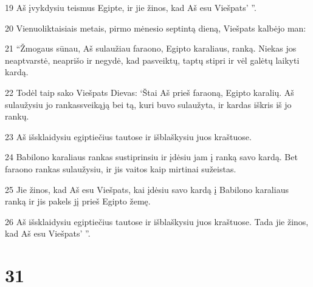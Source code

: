 \par 19 Aš įvykdysiu teismus Egipte, ir jie žinos, kad Aš esu Viešpats’ ”. 
\par 20 Vienuoliktaisiais metais, pirmo mėnesio septintą dieną, Viešpats kalbėjo man: 
\par 21 “Žmogaus sūnau, Aš sulaužiau faraono, Egipto karaliaus, ranką. Niekas jos neaptvarstė, neaprišo ir negydė, kad pasveiktų, taptų stipri ir vėl galėtų laikyti kardą. 
\par 22 Todėl taip sako Viešpats Dievas: ‘Štai Aš prieš faraoną, Egipto karalių. Aš sulaužysiu jo rankas­sveikąją bei tą, kuri buvo sulaužyta, ir kardas iškris iš jo rankų. 
\par 23 Aš išsklaidysiu egiptiečius tautose ir išblaškysiu juos kraštuose. 
\par 24 Babilono karaliaus rankas sustiprinsiu ir įdėsiu jam į ranką savo kardą. Bet faraono rankas sulaužysiu, ir jis vaitos kaip mirtinai sužeistas. 
\par 25 Jie žinos, kad Aš esu Viešpats, kai įdėsiu savo kardą į Babilono karaliaus ranką ir jis pakels jį prieš Egipto žemę. 
\par 26 Aš išsklaidysiu egiptiečius tautose ir išblaškysiu juos kraštuose. Tada jie žinos, kad Aš esu Viešpats’ ”.



\chapter{31}


